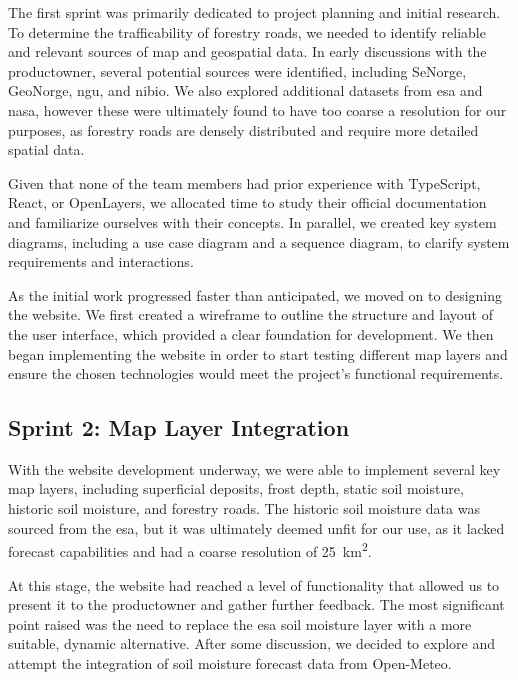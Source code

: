 The first sprint was primarily dedicated to project planning and initial research.  To determine the trafficability of forestry roads, we needed to identify reliable and relevant sources of map and geospatial data. In early discussions with the \gls{productowner}, several potential sources were identified, including SeNorge, GeoNorge, \acrshort{ngu}, and \acrshort{nibio}. We also explored additional datasets from \acrshort{esa} and \acrshort{nasa}, however these were ultimately found to have too coarse a resolution for our purposes, as forestry roads are densely distributed and require more detailed spatial data.

Given that none of the team members had prior experience with TypeScript, React, or OpenLayers, we allocated time to study their official documentation and familiarize ourselves with their concepts. In parallel, we created key system diagrams, including a use case diagram and a sequence diagram, to clarify system requirements and interactions. 

As the initial work progressed faster than anticipated, we moved on to designing the website. We first created a wireframe to outline the structure and layout of the user interface, which provided a clear foundation for development. We then began implementing the website in order to start testing different map layers and ensure the chosen technologies would meet the project's functional requirements.

\subsection*{Sprint 2: Map Layer Integration}

With the website development underway, we were able to implement several key map layers, including superficial deposits, frost depth, static soil moisture, historic soil moisture, and forestry roads. The historic soil moisture data was sourced from the \acrshort{esa}, but it was ultimately deemed unfit for our use, as it lacked forecast capabilities and had a coarse resolution of \qty{25}{\kilo\meter\squared}.

At this stage, the website had reached a level of functionality that allowed us to present it to the \gls{productowner} and gather further feedback. The most significant point raised was the need to replace the \acrshort{esa} soil moisture layer with a more suitable, dynamic alternative. After some discussion, we decided to explore and attempt the integration of soil moisture forecast data from Open-Meteo.

